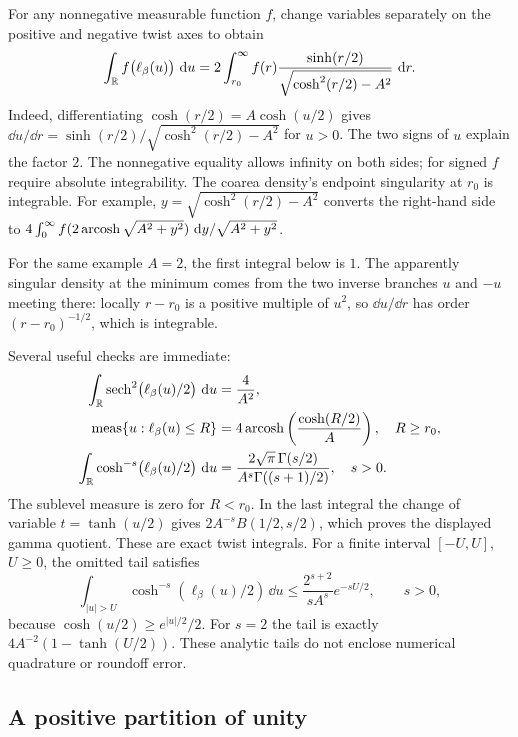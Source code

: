 For any nonnegative measurable function $f$, change variables separately
on the positive and negative twist axes to obtain
\begin{equation}
 \int_{\mathbb R}f\bigl(\ell_\beta(u)\bigr)\,\mathop{}\!\mathrm d u
 =2\int_{r_0}^\infty
 f(r)\frac{\sinh(r/2)}{\sqrt{\cosh^2(r/2)-A^2}}\,\mathop{}\!\mathrm d r.
 \label{eq:toruscoarea}
\end{equation}
Indeed, differentiating $\cosh(r/2)=A\cosh(u/2)$ gives
$\dd u/\dd r=\sinh(r/2)/\sqrt{\cosh^2(r/2)-A^2}$ for $u>0$.
The two signs of $u$ explain the factor $2$. The nonnegative equality
allows infinity on both sides; for signed $f$ require absolute
integrability. The coarea density's endpoint singularity at $r_0$ is
integrable. For
example, $y=\sqrt{\cosh^2(r/2)-A^2}$ converts the right-hand side to
$4\int_0^\infty f(2\operatorname{arcosh}\sqrt{A^2+y^2})\,\mathop{}\!\mathrm d y/\sqrt{A^2+y^2}$.

For the same example $A=2$, the first integral below is $1$.
The apparently singular density at the minimum comes from the
two inverse branches $u$ and $-u$ meeting there: locally
$r-r_0$ is a positive multiple of $u^2$, so $\dd u/\dd r$
has order $(r-r_0)^{-1/2}$, which is integrable.

Several useful checks are immediate:
\begin{align}
 \int_{\mathbb R}\operatorname{sech}^2\bigl(\ell_\beta(u)/2\bigr)\,\mathop{}\!\mathrm d u
     &=\frac4{A^2},\label{eq:sechintegral}\\
 \operatorname{meas}\{u:\ell_\beta(u)\le R\}
     &=4\operatorname{arcosh}\left(\frac{\cosh(R/2)}{A}\right),\quad R\ge r_0,
       \label{eq:sublevel}\\
 \int_{\mathbb R}\cosh^{-s}\bigl(\ell_\beta(u)/2\bigr)\,\mathop{}\!\mathrm d u
     &=\frac{2\sqrt\pi\,\Gamma(s/2)}
             {A^s\Gamma((s+1)/2)},\quad s>0.
       \label{eq:betaintegral}
\end{align}
The sublevel measure is zero for $R<r_0$. In the last integral the change
of variable $t=\tanh(u/2)$ gives
$2A^{-s}B(1/2,s/2)$, which proves the displayed gamma quotient.
These are exact twist integrals. For a finite interval $[-U,U]$, $U\geq0$,
the omitted tail satisfies
\begin{equation}
 \int_{|u|>U}\cosh^{-s}(\ell_\beta(u)/2)\,\dd u
 \leq\frac{2^{s+2}}{sA^s}e^{-sU/2},\qquad s>0,
 \label{eq:torusintegraltail}
\end{equation}
because $\cosh(u/2)\geq e^{|u|/2}/2$.
For $s=2$ the tail is exactly $4A^{-2}(1-\tanh(U/2))$.
These analytic tails do not enclose numerical quadrature or roundoff error.

\subsection{A positive partition of unity}

